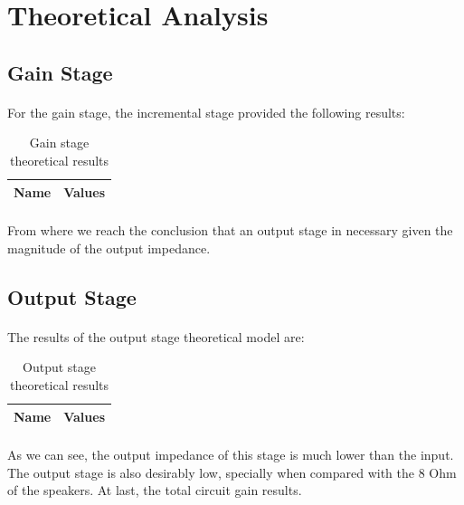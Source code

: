 \section{Theoretical Analysis}
\label{sec:analysis}

\subsection{Gain Stage}

\paragraph{} For the gain stage, the incremental stage provided the following results:

\begin{table}[h]
  \centering
  \begin{tabular}{|l|r|}
    \hline    
    {\bf Name} & {\bf Values} \\ \hline
     
  \end{tabular}
  \caption{Gain stage theoretical results}
  \label{tab:gain}
\end{table}

\paragraph{} From where we reach the conclusion that an output stage in necessary given the magnitude of the output impedance.

\subsection{Output Stage}

\paragraph{} The results of the output stage theoretical model are:

\begin{table}[h]
  \centering
  \begin{tabular}{|l|r|}
    \hline    
    {\bf Name} & {\bf Values} \\ \hline
     
  \end{tabular}
  \caption{Output stage theoretical results}
  \label{tab:output}
\end{table}

\paragraph{} As we can see, the output impedance of this stage is much lower than the input. The output stage is also desirably low, specially when compared with the 8 Ohm of the speakers. At last, the total circuit gain results.

